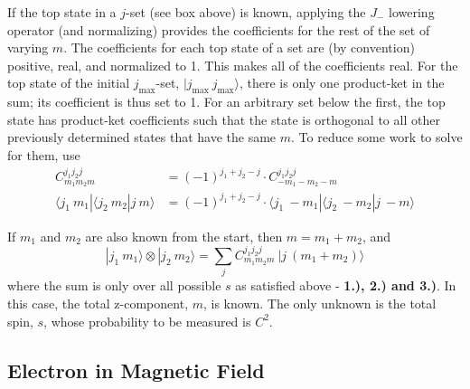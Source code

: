 \documentclass[12pt]{article}
\begin{document}
\vspace{15pt} 
    If the top state in a \(j\)-set (see box above) is known, applying the \(J_-\) lowering operator (and normalizing) %
provides the coefficients for the rest of the set of varying \(m\). %
The coefficients for each top state of a set are (by convention) positive, real, %
and normalized to 1. This makes all of the coefficients real. For the top state of the initial %
\(j_\text{max}\)-set, \( | j_\text{max}\ j_\text{max} \rangle\), %
there is only one product-ket in the sum; its coefficient %
is thus set to 1. For an arbitrary set below the first, the top state has product-ket coefficients such that the state %
is orthogonal to all other previously determined states that have the same \(m\). To reduce some work to solve for them, use %
\[ 
    \begin{aligned}
        C^{j_1 j_2 j}_{m_{1} m_{2} m} & = (-1)^{j_1 + j_2-  j} \cdot C^{j_1 j_2 j}_{-m_{1} -m_{2} -m}\\[5pt]
        \langle j_1 \ m_1 | \langle j_2\ m_2 | j\ m \rangle & 
            = (-1)^{j_1 + j_2-  j} \cdot \langle j_1 \ -m_1 | \langle j_2\ -m_2 | j\ -m\rangle 
    \end{aligned}
\]

\vspace{15pt} 
    If \(m_1\) and \(m_2\) are also known from the start, then \(m = m_1 + m_2\), and
\[ 
    \boxed{ 
        | j_1 \ m_1 \rangle \otimes | j_2 \ m_2 \rangle 
        = \sum_j C^{j_1 j_2 j}_{m_{1} m_{2} m} \ | j \ {\scriptstyle (m_1+m_2)} \rangle 
    } 
\]
where the sum is only over all possible \(s\) as satisfied above - \textbf{1.), 2.) and 3.)}.
In this case, the total z-component, \(m\), is known. The only unknown is the total spin, \(s\), 
whose probability to be measured is \(C^2\).

%
%
\newpage
\subsection{Electron in Magnetic Field}
\end{document}
